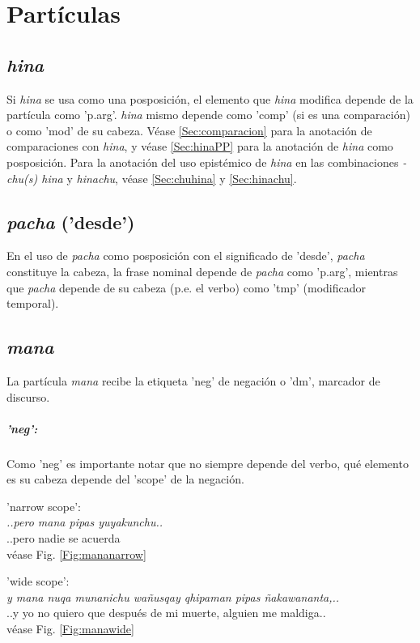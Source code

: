 \documentclass[a4paper,11pt,DIV12]{scrartcl}
\begin{document}
  
\section{Part\'iculas}
  \subsection{{\em hina}}\label{Sec:particulahina} Si {\em hina} se usa como una posposici\'on, el elemento que {\em hina} modifica depende de la part\'icula como 'p.arg'. {\em hina} mismo depende como 'comp' (si es una comparaci\'on) o como 'mod' de su cabeza. V\'ease \ref{Sec:comparacion} para la anotaci\'on de comparaciones con {\em hina}, y v\'ease \ref{Sec:hinaPP} para la anotaci\'on de {\em hina} como posposici\'on. Para la anotaci\'on del uso epist\'emico de {\em hina} en las combinaciones {\em -chu(s) hina} y {\em hinachu}, v\'ease \ref{Sec:chuhina} y \ref{Sec:hinachu}.

\subsection{{\em pacha} ('desde')}\label{Sec:particulapacha}

En el uso de {\em pacha} como posposici\'on con el significado de 'desde', {\em pacha} constituye la cabeza, la frase nominal depende de {\em pacha} como 'p.arg', mientras que {\em pacha} depende de su cabeza (p.e. el verbo) como  'tmp' (modificador temporal).

  \subsection{{\em mana}} La part\'icula {\em mana} recibe la etiqueta 'neg' de negaci\'on o 'dm', marcador de discurso. 
\subparagraph{'neg':}
Como 'neg' es importante notar que no siempre depende del verbo, qu\'e elemento es su cabeza depende del 'scope' de la negaci\'on.

\begin{examples}
 \item 'narrow scope':\\
	{\em ..pero mana pipas yuyakunchu..}\\
      ..pero nadie se acuerda\\
	v\'ease Fig. \ref{Fig:mananarrow}
 \item  'wide scope':\\
	{\em y mana nuqa munanichu wañusqay qhipaman pipas ñakawananta,..}\\
	..y yo no quiero que después de mi muerte, alguien me maldiga..\\
	v\'ease Fig. \ref{Fig:manawide}\\
 	\hfill{\small \citep{Valderrama77}}	
\end{examples}
\end{document}
